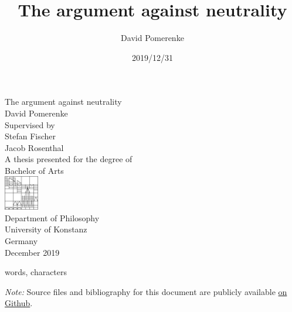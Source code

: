 \documentclass{report}
\title{The argument against neutrality}
\author{David Pomerenke}
\date{2019/12/31}
\begin{document}
\begin{titlepage}
    \begin{center}
        \vspace*{1cm}
        \huge
        The argument against neutrality\\
        \large
        David Pomerenke\\
        \vfill
        Supervised by\\
        Stefan Fischer\\
        Jacob Rosenthal\\
        \vfill
        A thesis presented for the degree of\\
        Bachelor of Arts\\
        \vfill
        \includegraphics[width=1.5cm]{0-logo.png}\\
        Department of Philosophy\\
        University of Konstanz\\
        Germany\\
        December 2019\\
    \end{center}
\end{titlepage}

\tableofcontents









 words,
 characters




\emph{Note:} Source files and bibliography for this document are publicly available \href{https://github.com/davidpomerenke/ba}{on Github}.
\end{document}
